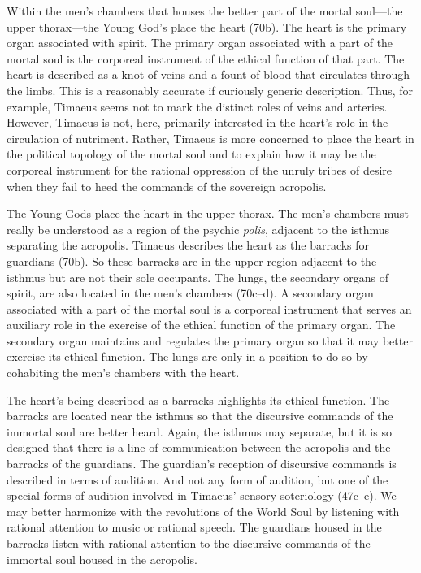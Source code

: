 Within the men's chambers that houses the better part of the mortal soul---the upper thorax---the Young God's place the heart (70b). The heart is the primary organ associated with spirit. The primary organ associated with a part of the mortal soul is the corporeal instrument of the ethical function of that part. The heart is described as a knot of veins and a fount of blood that circulates through the limbs. This is a reasonably accurate if curiously generic description. Thus, for example, Timaeus seems not to mark the distinct roles of veins and arteries. However, Timaeus is not, here, primarily interested in the heart's role in the circulation of nutriment. Rather, Timaeus is more concerned to place the heart in the political topology of the mortal soul and to explain how it may be the corporeal instrument for the rational oppression of the unruly tribes of desire when they fail to heed the commands of the sovereign acropolis.

The Young Gods place the heart in the upper thorax. The men's chambers must really be understood as a region of the psychic \emph{polis}, adjacent to the isthmus separating the acropolis. Timaeus describes the heart as the barracks for guardians (70b). So these barracks are in the upper region adjacent to the isthmus but are not their sole occupants. The lungs, the secondary organs of spirit, are also located in the men's chambers (70c--d). A secondary organ associated with a part of the mortal soul is a corporeal instrument that serves an auxiliary role in the exercise of the ethical function of the primary organ. The secondary organ maintains and regulates the primary organ so that it may better exercise its ethical function. The lungs are only in a position to do so by cohabiting the men's chambers with the heart.

The heart's being described as a barracks highlights its ethical function. The barracks are located near the isthmus so that the discursive commands of the immortal soul are better heard. Again, the isthmus may separate, but it is so designed that there is a line of communication between the acropolis and the barracks of the guardians. The guardian's reception of discursive commands is described in terms of audition. And not any form of audition, but one of the special forms of audition involved in Timaeus' sensory soteriology (47c--e). We may better harmonize with the revolutions of the World Soul by listening with rational attention to music or rational speech. The guardians housed in the barracks listen with rational attention to the discursive commands of the immortal soul housed in the acropolis.

